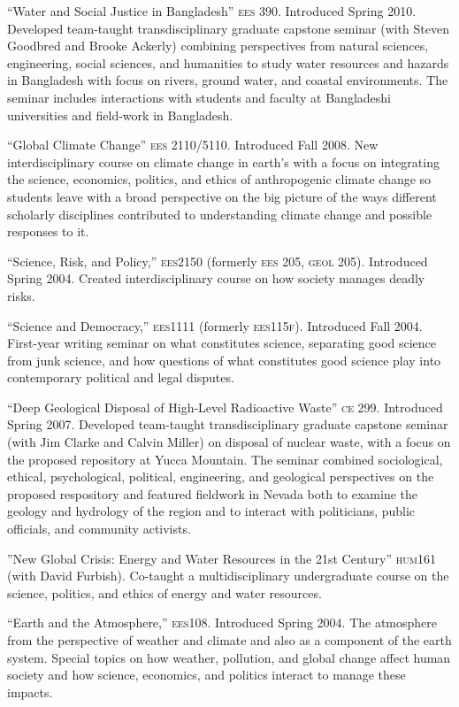 %
%
\item ``Water and Social Justice in Bangladesh'' \textsc{ees 390}. Introduced Spring 2010. Developed team-taught transdisciplinary graduate capstone seminar (with Steven Goodbred and Brooke Ackerly) combining perspectives from natural sciences, engineering, social sciences, and humanities to study water resources and hazards in Bangladesh with focus on rivers, ground water, and coastal environments. The seminar includes interactions with students and faculty at Bangladeshi universities and field-work in Bangladesh.
\item ``Global Climate Change'' \textsc{ees 2110/5110}. Introduced Fall 2008. New interdisciplinary course on climate change in earth's with a focus on integrating the science, economics, politics, and ethics of anthropogenic climate change so students leave with a broad perspective on the big picture of the ways different scholarly disciplines contributed to understanding climate change and possible responses to it.
\item ``Science, Risk, and Policy,'' \textsc{ees2150} (formerly \textsc{ees 205}, \textsc{geol 205}). Introduced Spring 2004. Created interdisciplinary course on how society manages deadly risks.
\item ``Science and Democracy,'' \textsc{ees1111} (formerly \textsc{ees115f}). Introduced Fall 2004.  First-year writing seminar on what constitutes science, separating good science from junk science, and how questions of what constitutes good science play into contemporary political and legal disputes.
\item ``Deep Geological Disposal of High-Level Radioactive Waste'' \textsc{ce 299}. Introduced Spring 2007. Developed team-taught transdisciplinary graduate capstone seminar (with Jim Clarke and Calvin Miller) on disposal of nuclear waste, with a focus on the proposed repository at Yucca Mountain. The seminar combined sociological, ethical, psychological, political, engineering, and geological perspectives on the proposed respository and featured fieldwork in Nevada both to examine the geology and hydrology of the region and to interact with politicians, public officials, and community activists.
\item ''New Global Crisis: Energy and Water Resources in the 21st Century'' \textsc{hum161} (with David Furbish). Co-taught a multidisciplinary undergraduate course on the science, politics, and ethics of energy and water resources.
\item ``Earth and the Atmosphere,'' \textsc{ees108}. Introduced Spring 2004. The atmosphere from the perspective of weather and climate and also as a component of the earth system. Special topics on how weather, pollution, and global change affect human society and how science, economics, and politics interact to manage these impacts.
